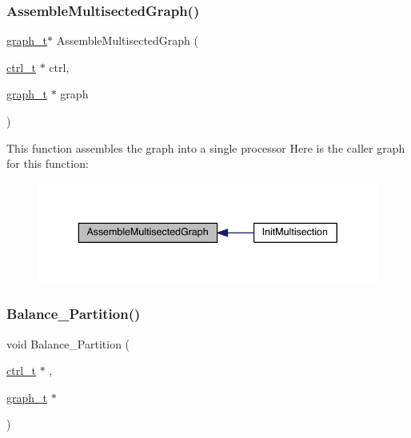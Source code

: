 \subsubsection{\texorpdfstring{Assemble\+Multisected\+Graph()}{AssembleMultisectedGraph()}}
{\footnotesize\ttfamily \hyperlink{a00734}{graph\+\_\+t}$\ast$ Assemble\+Multisected\+Graph (\begin{DoxyParamCaption}\item[{\hyperlink{a00742}{ctrl\+\_\+t} $\ast$}]{ctrl,  }\item[{\hyperlink{a00734}{graph\+\_\+t} $\ast$}]{graph }\end{DoxyParamCaption})}

This function assembles the graph into a single processor Here is the caller graph for this function\+:\nopagebreak
\begin{figure}[H]
\begin{center}
\leavevmode
\includegraphics[width=340pt]{a00951_a3350935f0305685a53c03209ace4d6dc_icgraph}
\end{center}
\end{figure}
\mbox{\label{a00951_aa24ead3c2c8fb3e58110f1f79453ce29}} 
\subsubsection{\texorpdfstring{Balance\+\_\+\+Partition()}{Balance\_Partition()}}
{\footnotesize\ttfamily void Balance\+\_\+\+Partition (\begin{DoxyParamCaption}\item[{\hyperlink{a00742}{ctrl\+\_\+t} $\ast$}]{,  }\item[{\hyperlink{a00734}{graph\+\_\+t} $\ast$}]{ }\end{DoxyParamCaption})}


